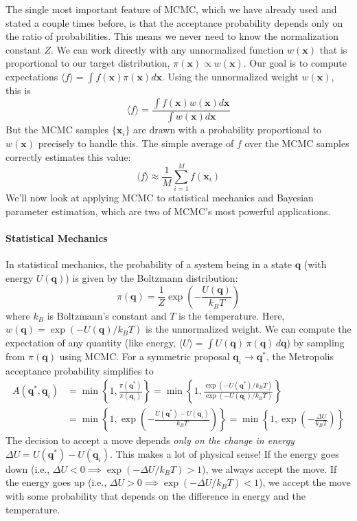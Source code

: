 The single most important feature of MCMC, which we have already used and stated a couple times before, is that the acceptance probability depends only on the ratio of probabilities. This means we never need to know the normalization constant $Z$. We can work directly with any unnormalized function $w(\mathbf{x})$ that is proportional to our target distribution, $\pi(\mathbf{x}) \propto w(\mathbf{x})$. Our goal is to compute expectations $\langle f \rangle = \int f(\mathbf{x}) \pi(\mathbf{x}) d\mathbf{x}$. Using the unnormalized weight $w(\mathbf{x})$, this is
\begin{equation}
    \langle f \rangle = \frac{\int f(\mathbf{x}) w(\mathbf{x}) d\mathbf{x}}{\int w(\mathbf{x}) d\mathbf{x}}
\end{equation}
But the MCMC samples $\{\mathbf{x}_i\}$ are drawn with a probability proportional to $w(\mathbf{x})$ precisely to handle this. The simple average of $f$ over the MCMC samples correctly estimates this value:
\begin{equation}
    \langle f \rangle \approx \frac{1}{M} \sum_{i=1}^{M} f(\mathbf{x}_i)
\end{equation}
We'll now look at applying MCMC to statistical mechanics and Bayesian parameter estimation, which are two of MCMC's most powerful applications.

\paragraph*{Statistical Mechanics}
In statistical mechanics, the probability of a system being in a state $\mathbf{q}$ (with energy $U(\mathbf{q})$) is given by the Boltzmann distribution:
\begin{equation}
    \pi(\mathbf{q}) = \frac{1}{Z} \exp\left(-\frac{U(\mathbf{q})}{k_B T}\right)
\end{equation}
where $k_B$ is Boltzmann's constant and $T$ is the temperature. Here, $w(\mathbf{q}) = \exp(-U(\mathbf{q})/k_B T)$ is the unnormalized weight. We can compute the expectation of any quantity (like energy, $\langle U \rangle = \int U(\mathbf{q})\,\pi(\mathbf{q})\,d\mathbf{q}$) by sampling from $\pi(\mathbf{q})$ using MCMC.
For a symmetric proposal $\mathbf{q}_i \to \mathbf{q}^*$, the Metropolis acceptance probability simplifies to
\begin{align}
    A(\mathbf{q}^*, \mathbf{q}_i) &= \min \left\{ 1, \frac{\pi(\mathbf{q}^*)}{\pi(\mathbf{q}_i)} \right\}
    = \min \left\{ 1, \frac{\exp(-U(\mathbf{q}^*)/k_B T)}{\exp(-U(\mathbf{q}_i)/k_B T)} \right\} \\
    &= \min \left\{ 1, \exp\left(-\frac{U(\mathbf{q}^*) - U(\mathbf{q}_i)}{k_B T}\right) \right\} = \min \left\{ 1, \exp\left(-\frac{\Delta U}{k_B T}\right) \right\}
\end{align}
The decision to accept a move depends \emph{only on the change in energy} $\Delta U = U(\mathbf{q}^*) - U(\mathbf{q}_i)$. This makes a lot of physical sense! If the energy goes down (i.e., $\Delta U < 0 \implies \exp(-\Delta U/k_B T) > 1$), we always accept the move. If the energy goes up (i.e., $\Delta U > 0 \implies \exp(-\Delta U/k_B T) < 1$), we accept the move with some probability that depends on the difference in energy and the temperature.

